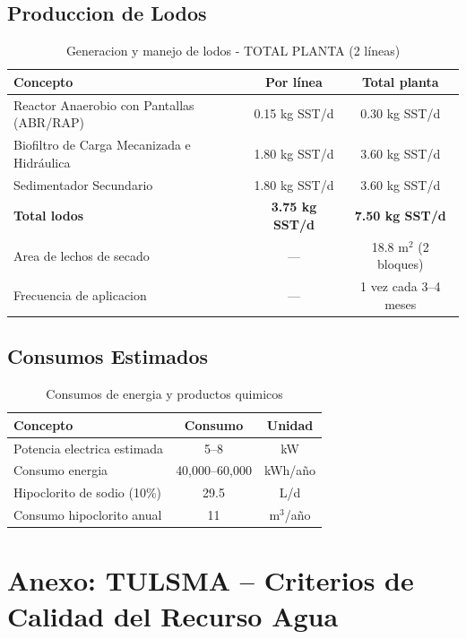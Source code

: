 \documentclass[12pt,a4paper]{article}
\begin{document}
\subsection{Produccion de Lodos}

\begin{table}[H]
\centering
\caption{Generacion y manejo de lodos - TOTAL PLANTA (2 líneas)}
\begin{tabular}{p{6cm}cc}
\toprule
\textbf{Concepto} & \textbf{Por línea} & \textbf{Total planta} \\
\midrule
Reactor Anaerobio con Pantallas (ABR/RAP) & 0.15 kg SST/d & 0.30 kg SST/d \\
Biofiltro de Carga Mecanizada e Hidráulica & 1.80 kg SST/d & 3.60 kg SST/d \\
Sedimentador Secundario & 1.80 kg SST/d & 3.60 kg SST/d \\
\midrule
\textbf{Total lodos} & \textbf{3.75 kg SST/d} & \textbf{7.50 kg SST/d} \\
Area de lechos de secado & --- & 18.8 m$^2$ (2 bloques) \\
Frecuencia de aplicacion & --- & 1 vez cada 3--4 meses \\
\bottomrule
\end{tabular}
\end{table}

\subsection{Consumos Estimados}

\begin{table}[H]
\centering
\caption{Consumos de energia y productos quimicos}
\begin{tabular}{lcc}
\toprule
\textbf{Concepto} & \textbf{Consumo} & \textbf{Unidad} \\
\midrule
Potencia electrica estimada & 5--8 & kW \\
Consumo energia & 40,000--60,000 & kWh/a\~no \\
Hipoclorito de sodio (10\%) & 29.5 & L/d \\
Consumo hipoclorito anual & 11 & m$^3$/a\~no \\
\bottomrule
\end{tabular}
\end{table}




\newpage




\newpage
\appendix
\section{Anexo: TULSMA -- Criterios de Calidad del Recurso Agua}
\label{app:tulsma}
\end{document}
